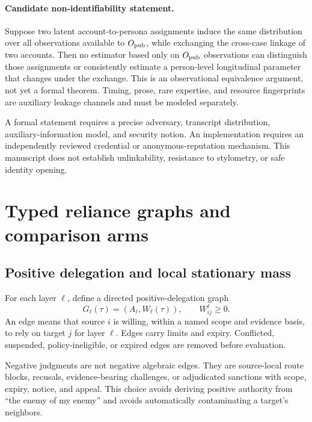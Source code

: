 \documentclass[11pt]{article}
\begin{document}
\paragraph{Candidate non-identifiability statement.}
Suppose two latent account-to-persona assignments induce the same distribution over all observations available to $O_{\rm pub}$, while exchanging the cross-case linkage of two accounts.  Then no estimator based only on $O_{\rm pub}$ observations can distinguish those assignments or consistently estimate a person-level longitudinal parameter that changes under the exchange.  This is an observational equivalence argument, not yet a formal theorem.  Timing, prose, rare expertise, and resource fingerprints are auxiliary leakage channels and must be modeled separately.

\begin{evidencegate}
A formal statement requires a precise adversary, transcript distribution, auxiliary-information model, and security notion.  An implementation requires an independently reviewed credential or anonymous-reputation mechanism.  This manuscript does not establish unlinkability, resistance to stylometry, or safe identity opening.
\end{evidencegate}

\section{Typed reliance graphs and comparison arms}

\subsection{Positive delegation and local stationary mass}

For each layer $\ell$, define a directed positive-delegation graph
\begin{equation}
 G_\ell(\tau)=(A_\ell,W_\ell(\tau)),\qquad W_{ij}^{\ell}\geq 0.
\end{equation}
An edge means that source $i$ is willing, within a named scope and evidence basis, to rely on target $j$ for layer $\ell$.  Edges carry limits and expiry.  Conflicted, suspended, policy-ineligible, or expired edges are removed before evaluation.

Negative judgments are not negative algebraic edges.  They are source-local route blocks, recusals, evidence-bearing challenges, or adjudicated sanctions with scope, expiry, notice, and appeal.  This choice avoids deriving positive authority from ``the enemy of my enemy'' and avoids automatically contaminating a target's neighbors.
\end{document}
